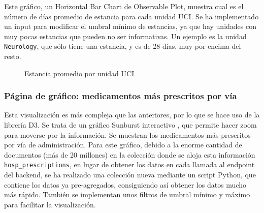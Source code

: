 Este gráfico, un Horizontal Bar Chart \cite{hbarchart} de Observable Plot, muestra cual es el  número de días promedio de estancia para cada unidad UCI. Se ha implementado un input para modificar el umbral mínimo de estancias, ya que hay unidades con muy pocas estancias que pueden no ser informativas. Un ejemplo es la unidad \texttt{Neurology}, que sólo tiene una estancia, y es de 28 días, muy por encima del resto. 



\begin{figure}[H]
  \centering
  \caption{Estancia promedio por unidad UCI}
  \label{fig:chart-icu}
\end{figure}


\subsubsection{Página de gráfico: medicamentos más prescritos por vía}

Esta visualización es más compleja que las anteriores, por lo que se hace uso de la librería D3. Se trata de un gráfico Sunburst interactivo \cite{sunburst}, que permite hacer zoom para moverse por la información. Se muestran los medicamentos más prescritos por vía de administración. Para este gráfico, debido a la enorme cantidad de documentos (más de 20 millones) en la colección donde se aloja esta información \texttt{hosp\_prescriptions}, en lugar de obtener los datos en cada llamada al endpoint del backend, se ha realizado una colección nueva mediante un script Python, que contiene los datos ya pre-agregados, consiguiendo así obtener los datos mucho más rápido. También se implementan unos filtros de umbral mínimo y máximo para facilitar la visualización.

